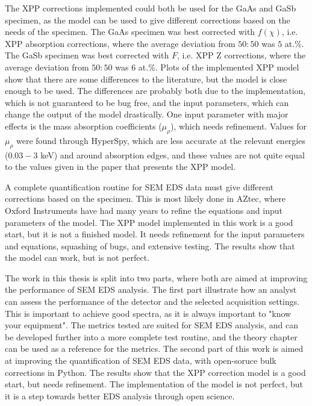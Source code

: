 The XPP corrections implemented could both be used for the GaAs and GaSb specimen, as the model can be used to give different corrections based on the needs of the specimen.
The GaAs specimen was best corrected with $f(\chi)$, i.e. XPP absorption corrections, where the average deviation from $50:50$ was $5$ at.\%.
The GaSb specimen was best corrected with $F$, i.e. XPP Z corrections, where the average deviation from $50:50$ was $6$ at.\%.
Plots of the implemented XPP model show that there are some differences to the literature, but the model is close enough to be used.
The differences are probably both due to the implementation, which is not guaranteed to be bug free, and the input parameters, which can change the output of the model drastically.
One input parameter with major effects is the mass absorption coefficients ($\mu_\rho$), which needs refinement.
Values for $\mu_\rho$ were found through HyperSpy, which are less accurate at the relevant energies ($0.03-3$ keV) and around absorption edges, and these values are not quite equal to the values given in the paper that presents the XPP model.


A complete quantification routine for SEM EDS data must give different corrections based on the specimen.
This is most likely done in AZtec, where Oxford Instruments have had many years to refine the equations and input parameters of the model.
The XPP model implemented in this work is a good start, but it is not a finished model. 
It needs refinement for the input parameters and equations, squashing of bugs, and extensive testing.
The results show that the model can work, but is not perfect.



The work in this thesis is split into two parts, where both are aimed at improving the performance of SEM EDS analysis.
The first part illustrate how an analyst can assess the performance of the detector and the selected acquisition settings.
This is important to achieve good spectra, as it is always important to "know your equipment".
The metrics tested are suited for SEM EDS analysis, and can be developed further into a more complete test routine, and the theory chapter can be used as a reference for the metrics.
The second part of this work is aimed at improving the quantification of SEM EDS data, with open-soruce bulk corrections in Python.
The results show that the XPP correction model is a good start, but needs refinement.
The implementation of the model is not perfect, but it is a step towards better EDS analysis through open science.





